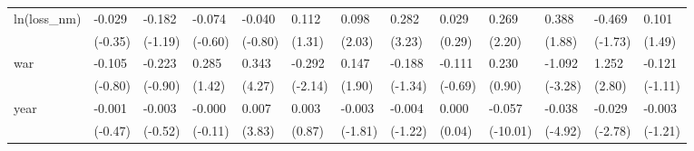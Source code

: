 \begin{tabular}{p{1.5cm} p{1.7cm} p{1.7cm} p{1.7cm} p{1.7cm} p{1.7cm} p{1.7cm} p{1.7cm} p{1.7cm} p{1.7cm} p{1.7cm} p{1.7cm} p{1.7cm}}
\hline
ln(loss\_nm)     &   -0.029         &   -0.182         &   -0.074         &   -0.040         &    0.112         &    0.098\sym{*}  &    0.282\sym{**} &    0.029         &    0.269\sym{*}  &    0.388         &   -0.469         &    0.101         \\
                &  (-0.35)         &  (-1.19)         &  (-0.60)         &  (-0.80)         &   (1.31)         &   (2.03)         &   (3.23)         &   (0.29)         &   (2.20)         &   (1.88)         &  (-1.73)         &   (1.49)         \\
war             &   -0.105         &   -0.223         &    0.285         &    0.343\sym{***}&   -0.292\sym{*}  &    0.147         &   -0.188         &   -0.111         &    0.230         &   -1.092\sym{**} &    1.252\sym{**} &   -0.121         \\
                &  (-0.80)         &  (-0.90)         &   (1.42)         &   (4.27)         &  (-2.14)         &   (1.90)         &  (-1.34)         &  (-0.69)         &   (0.90)         &  (-3.28)         &   (2.80)         &  (-1.11)         \\
year            &   -0.001         &   -0.003         &   -0.000         &    0.007\sym{***}&    0.003         &   -0.003         &   -0.004         &    0.000         &   -0.057\sym{***}&   -0.038\sym{***}&   -0.029\sym{**} &   -0.003         \\
                &  (-0.47)         &  (-0.52)         &  (-0.11)         &   (3.83)         &   (0.87)         &  (-1.81)         &  (-1.22)         &   (0.04)         & (-10.01)         &  (-4.92)         &  (-2.78)         &  (-1.21)         \\
\end{tabular}
